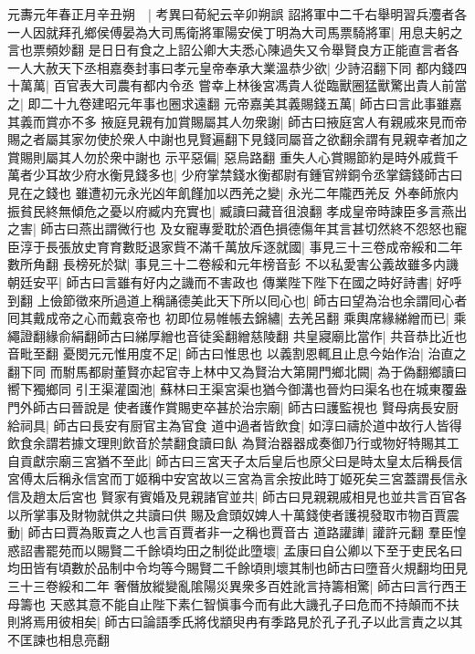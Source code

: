 元夀元年春正月辛丑朔　|{
	考異曰荀紀云辛卯朔誤}
詔將軍中二千右舉明習兵灋者各一人因就拜孔鄉侯傅晏為大司馬衛將軍陽安侯丁明為大司馬票騎將軍|{
	用息夫躬之言也票頻妙翻}
是日日有食之上詔公卿大夫悉心陳過失又令舉賢良方正能直言者各一人大赦天下丞相嘉奏封事曰孝元皇帝奉承大業溫恭少欲|{
	少詩沼翻下同}
都内錢四十萬萬|{
	百官表大司農有都内令丞}
嘗幸上林後宮馮貴人從臨獸圈猛獸驚出貴人前當之|{
	即二十九卷建昭元年事也圈求遠翻}
元帝嘉美其義賜錢五萬|{
	師古曰言此事雖嘉其義而賞亦不多}
掖庭見親有加賞賜屬其人勿衆謝|{
	師古曰掖庭宮人有親戚來見而帝賜之者屬其家勿使於衆人中謝也見賢遍翻下見錢同屬音之欲翻余謂有見親幸者加之賞賜則屬其人勿於衆中謝也}
示平惡偏|{
	惡烏路翻}
重失人心賞賜節約是時外戚貲千萬者少耳故少府水衡見錢多也|{
	少府掌禁錢水衡都尉有鍾官辨銅令丞掌鑄錢師古曰見在之錢也}
雖遭初元永光凶年飢饉加以西羌之變|{
	永光二年隴西羌反}
外奉師旅内振貧民終無傾危之憂以府臧内充實也|{
	臧讀曰藏音徂浪翻}
孝成皇帝時諫臣多言燕出之害|{
	師古曰燕出謂微行也}
及女寵專愛耽於酒色損德傷年其言甚切然終不怨怒也寵臣淳于長張放史育育數貶退家貲不滿千萬放斥逐就國|{
	事見三十三卷成帝綏和二年數所角翻}
長榜死於獄|{
	事見三十二卷綏和元年榜音彭}
不以私愛害公義故雖多内譏朝廷安平|{
	師古曰言雖有好内之譏而不害政也}
傳業陛下陛下在國之時好詩書|{
	好呼到翻}
上儉節徵來所過道上稱誦德美此天下所以囘心也|{
	師古曰望為治也余謂囘心者囘其戴成帝之心而戴哀帝也}
初即位易帷帳去錦繡|{
	去羌呂翻}
乘輿席緣綈繒而已|{
	乘繩證翻緣俞絹翻師古曰綈厚繒也音徒奚翻繒慈陵翻}
共皇寢廟比當作|{
	共音恭比近也音毗至翻}
憂閔元元惟用度不足|{
	師古曰惟思也}
以義割恩輒且止息今始作治|{
	治直之翻下同}
而駙馬都尉董賢亦起官寺上林中又為賢治大第開門鄉北闕|{
	為于偽翻鄉讀曰嚮下獨鄉同}
引王渠灌園池|{
	蘇林曰王渠宮渠也猶今御溝也晉灼曰渠名也在城東覆盎門外師古曰晉說是}
使者護作賞賜吏卒甚於治宗廟|{
	師古曰護監視也}
賢母病長安厨給祠具|{
	師古曰長安有厨官主為官食}
道中過者皆飲食|{
	如淳曰禱於道中故行人皆得飲食余謂若據文理則飲音於禁翻食讀曰飤}
為賢治器器成奏御乃行或物好特賜其工自貢獻宗廟三宮猶不至此|{
	師古曰三宮天子太后皇后也原父曰是時太皇太后稱長信宮傅太后稱永信宮而丁姬稱中安宮故以三宮為言余按此時丁姬死矣三宮蓋謂長信永信及趙太后宮也}
賢家有賓婚及見親諸官並共|{
	師古曰見親親戚相見也並共言百官各以所掌事及財物就供之共讀曰供}
賜及倉頭奴婢人十萬錢使者護視發取市物百賈震動|{
	師古曰賈為販賣之人也言百賈者非一之稱也賈音古}
道路讙譁|{
	讙許元翻}
羣臣惶惑詔書罷苑而以賜賢二千餘頃均田之制從此墮壞|{
	孟康曰自公卿以下至于吏民名曰均田皆有頃數於品制中令均等今賜賢二千餘頃則壞其制也師古曰墮音火規翻均田見三十三卷綏和二年}
奢僭放縱變亂隂陽災異衆多百姓訛言持籌相驚|{
	師古曰言行西王母籌也}
天惑其意不能自止陛下素仁智愼事今而有此大譏孔子曰危而不持顛而不扶則將焉用彼相矣|{
	師古曰論語季氏將伐顓臾冉有季路見於孔子孔子以此言責之以其不匡諫也相息亮翻}
